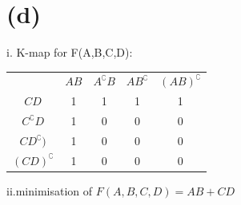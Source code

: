 \documentclass{article}
\begin{document}
\section*{(d)}
i.
K-map for F(A,B,C,D):
\begin{center}
\begin{tabular}{ c c c c c }
  & \(AB\) & \(A^\complement B\) & \(AB^\complement\) & \((AB)^\complement\) \\ 
 \(CD\)                & 1 & 1 & 1 & 1\\  
 \(C^\complement D\)   & 1 & 0 & 0 & 0 \\
 \(CD^\complement)\)   & 1 & 0 & 0 & 0 \\
 \((CD)^\complement\)  & 1 & 0 & 0 & 0 \\    
\end{tabular}
\end{center}
ii.minimisation of \(F(A,B,C,D)=AB+CD\)
\end{document}
